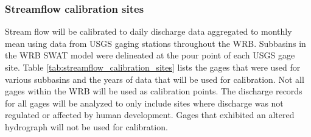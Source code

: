 \subsubsection{Streamflow calibration sites}\label{sec:streamflow_calibration_sites}

Stream flow will be calibrated to daily discharge data aggregated to monthly mean using data from USGS gaging stations throughout the WRB. Subbasins in the WRB SWAT model were delineated at the pour point of each USGS gage site. Table \ref{tab:streamflow_calibration_sites} lists the gages that were used for various subbasins and the years of data that will be used for calibration. Not all gages within the WRB will be used as calibration points. The discharge records for all gages will be analyzed to only include sites where discharge was not regulated or affected by human development. Gages that exhibited an altered hydrograph will not be used for calibration.
